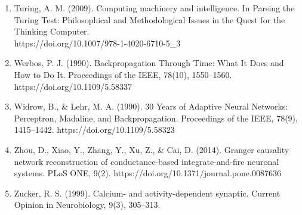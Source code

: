 \documentclass{article}
\begin{document}
\begin{enumerate}
\item Turing, A. M. (2009). Computing machinery and intelligence. In Parsing the Turing Test: Philosophical and Methodological Issues in the Quest for the Thinking Computer.\\ https://doi.org/10.1007/978-1-4020-6710-5\_3
\item Werbos, P. J. (1990). Backpropagation Through Time: What It Does and How to Do It. Proceedings of the IEEE, 78(10), 1550–1560. https://doi.org/10.1109/5.58337
\item Widrow, B., & Lehr, M. A. (1990). 30 Years of Adaptive Neural Networks: Perceptron, Madaline, and Backpropagation. Proceedings of the IEEE, 78(9), 1415–1442. https://doi.org/10.1109/5.58323
\item Zhou, D., Xiao, Y., Zhang, Y., Xu, Z., & Cai, D. (2014). Granger causality network reconstruction of conductance-based integrate-and-fire neuronal systems. PLoS ONE, 9(2). https://doi.org/10.1371/journal.pone.0087636
\item Zucker, R. S. (1999). Calcium- and activity-dependent synaptic. Current Opinion in Neurobiology, 9(3), 305–313.
\end{enumerate}
\end{document}
